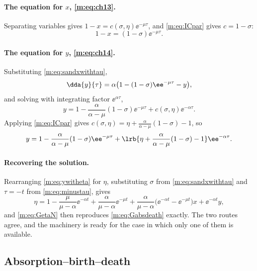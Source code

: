 \paragraph{The equation for $x$, \eqref{m:eq:ch13}.}
Separating variables gives $1-x = c(\sigma,\eta)\ee^{-\mu\tau}$, and
\cref{m:eq:ICpar} gives $c = 1-\sigma$:
\begin{equation}
\label{m:eq:sandxwithtau}
1-x = (1-\sigma)\ee^{-\mu\tau} .
\end{equation}

\paragraph{The equation for $y$, \eqref{m:eq:ch14}.}
Substituting \cref{m:eq:sandxwithtau},
\begin{equation*}
\dda{y}{\tau} = \alpha\bigl(1-(1-\sigma)\ee^{-\mu\tau}-y\bigr),
\end{equation*}
and solving with integrating factor $\ee^{\alpha\tau}$,
\begin{equation*}
y = 1-\frac{\alpha}{\alpha-\mu}(1-\sigma)\ee^{-\mu\tau} + c(\sigma,\eta)\ee^{-\alpha\tau} .
\end{equation*}
Applying \cref{m:eq:ICpar} gives
$c(\sigma,\eta) = \eta + \frac{\alpha}{\alpha-\mu}(1-\sigma)-1$, so
\begin{equation}
\label{m:eq:ywitheta}
y = 1-\frac{\alpha}{\alpha-\mu}(1-\sigma)\ee^{-\mu\tau}
+ \lrb{\eta + \frac{\alpha}{\alpha-\mu}(1-\sigma)-1}\ee^{-\alpha\tau} .
\end{equation}

\paragraph{Recovering the solution.}
Rearranging \cref{m:eq:ywitheta} for $\eta$, substituting $\sigma$ from
\cref{m:eq:sandxwithtau} and $\tau=-t$ from \cref{m:eq:minustau}, gives
\begin{equation*}
\eta = 1-\frac{\mu}{\mu-\alpha}\ee^{-\alpha t} + \frac{\alpha}{\mu-\alpha}\ee^{-\mu t}
+ \frac{\alpha}{\mu-\alpha}\bigl(\ee^{-\alpha t}-\ee^{-\mu t}\bigr)x
+ \ee^{-\alpha t}y ,
\end{equation*}
and \cref{m:eq:GetaN} then reproduces \cref{m:eq:Gabsdeath} exactly. The two routes
agree, and the machinery is ready for the case in which only one of them is
available.

\subsection{Absorption--birth--death}
\label{m:sec:absbirthdeath}

